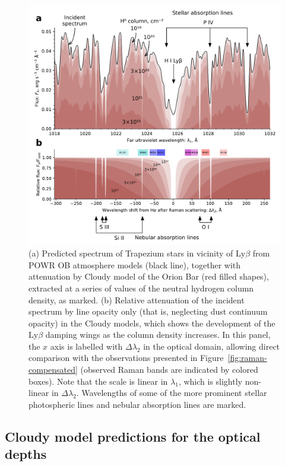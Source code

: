\documentclass[twocolumn, times]{aastex63}
\newcommand\lyb{\ensuremath{\text{Ly}\beta}}
\begin{document}
\begin{figure}
  \includegraphics[width=\linewidth]{figs/stellar-spectrum-fuv}
  \caption{(a) Predicted spectrum of Trapezium stars in vicinity of
    \lyb{} from POWR OB atmosphere models (black line), together with
    attenuation by Cloudy model of the Orion Bar (red filled shapes),
    extracted at a series of values of the neutral hydrogen column
    density, as marked. (b) Relative attenuation of the incident
    spectrum by line opacity only (that is, neglecting dust continuum
    opacity) in the Cloudy models, which shows the development of the
    \lyb{} damping wings as the column density increases.  In this
    panel, the \(x\) axis is labelled with \(\Delta\lambda_2\) in the optical
    domain, allowing direct comparison with the observations presented
    in Figure~\ref{fig:raman-compensated} (observed Raman bands are
    indicated by colored boxes). Note that the scale is linear in
    \(\lambda_1\), which is slightly non-linear in
    \(\Delta\lambda_2\).  Wavelengths of some of the more prominent stellar
    photospheric lines and nebular absorption lines are marked. }
  \label{fig:stellar-spectrum-fuv}
\end{figure}



\subsection{Cloudy model predictions for the optical depths}
\label{sec:cloudy-model-pred}
\end{document}
